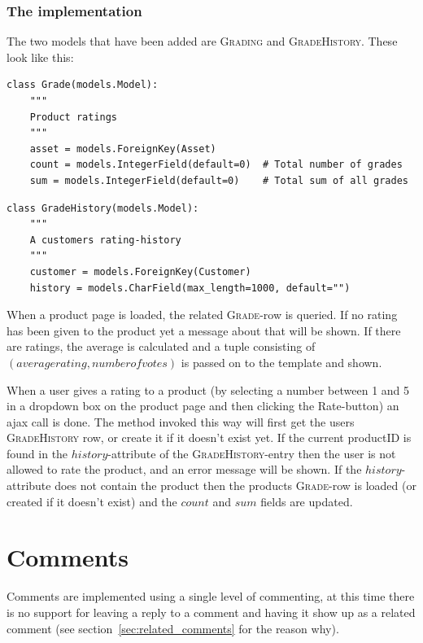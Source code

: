 \documentclass[12pt, a4paper,titlepage]{article}
\begin{document}
\subsubsection{The implementation}
The two models that have been added are \textsc{Grading} and 
\textsc{GradeHistory}. These look like this:
\begin{lstlisting}
class Grade(models.Model):
    """
    Product ratings
    """ 
    asset = models.ForeignKey(Asset)
    count = models.IntegerField(default=0)  # Total number of grades
    sum = models.IntegerField(default=0)    # Total sum of all grades
\end{lstlisting}
\begin{lstlisting}
class GradeHistory(models.Model):
    """
    A customers rating-history
    """ 
    customer = models.ForeignKey(Customer)
    history = models.CharField(max_length=1000, default="")
\end{lstlisting}

When a product page is loaded, the related \textsc{Grade}-row is queried.
If no rating has been given to the product yet a message about that will be
shown. If there are ratings, the average is calculated and a tuple consisting of
$(average rating, number of votes)$ is passed on to the template and shown.

When a user gives a rating to a product (by selecting a number between 1 and 5
in a dropdown box on the product page and then clicking the Rate-button) 
an ajax call is done. The method invoked this way will first get the users
\textsc{GradeHistory} row, or create it if it doesn't exist yet.
If the current productID is found in the $history$-attribute of the
\textsc{GradeHistory}-entry then the user is not allowed to rate the product,
and an error message will be shown. If the $history$-attribute does not contain
the product then the products \textsc{Grade}-row is loaded (or created if 
it doesn't exist) and the $count$ and $sum$ fields are updated.

\section{Comments}
Comments are implemented using a single level of commenting, at this time
there is no support for leaving a reply to a comment and having it show up
as a related comment (see section~\ref{sec:related_comments} for the 
reason why).
\end{document}
